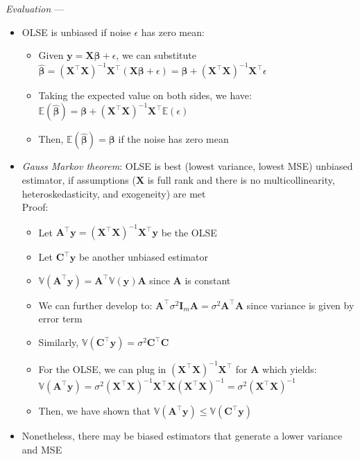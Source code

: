 \emph{Evaluation} ---
\begin{itemize}
    \item OLSE is unbiased if noise $\epsilon$ has zero mean:
    \begin{itemize}
        \item Given $\boldsymbol{y} = \boldsymbol{X}\boldsymbol{\beta} + \epsilon$, we can substitute $\boldsymbol{\hat{\beta}} = (\boldsymbol{X}^\intercal \boldsymbol{X})^{-1}  \boldsymbol{X}^\intercal (\boldsymbol{X}\boldsymbol{\beta} + \epsilon) = \boldsymbol{\beta} + (\boldsymbol{X}^\intercal \boldsymbol{X})^{-1}  \boldsymbol{X}^\intercal \epsilon$
        \item Taking the expected value on both sides, we have: $\mathbb{E}(\boldsymbol{\hat{\beta}}) = \boldsymbol{\beta} + (\boldsymbol{X}^\intercal \boldsymbol{X})^{-1}  \boldsymbol{X}^\intercal \mathbb{E}(\epsilon)$
        \item Then, $\mathbb{E}(\boldsymbol{\hat{\beta}}) = \boldsymbol{\beta}$ if the noise has zero mean
    \end{itemize}
    \item \emph{Gauss Markov theorem}: OLSE is best (lowest variance, lowest MSE) unbiased estimator, if assumptions ($\boldsymbol{X}$ is full rank and there is no multicollinearity, heteroskedasticity, and exogeneity) are met\\
    Proof:
    \begin{itemize}
        \item Let $\boldsymbol{A}^\intercal \boldsymbol{y} = (\boldsymbol{X}^\intercal \boldsymbol{X})^{-1}  \boldsymbol{X}^\intercal \boldsymbol{y}$ be the OLSE
        \item Let $\boldsymbol{C}^\intercal \boldsymbol{y}$ be another unbiased estimator
        \item $\mathbb{V}(\boldsymbol{A}^\intercal \boldsymbol{y}) = \boldsymbol{A}^\intercal \mathbb{V}(\boldsymbol{y}) \boldsymbol{A}$ since $\boldsymbol{A}$ is constant
        \item We can further develop to: $\boldsymbol{A}^\intercal \sigma^2 \boldsymbol{I}_m \boldsymbol{A} = \sigma^2 \boldsymbol{A}^\intercal \boldsymbol{A}$ since variance is given by error term
        \item Similarly, $\mathbb{V}(\boldsymbol{C}^\intercal \boldsymbol{y}) = \sigma^2 \boldsymbol{C}^\intercal \boldsymbol{C} $
        \item For the OLSE, we can plug in $(\boldsymbol{X}^\intercal \boldsymbol{X})^{-1}  \boldsymbol{X}^\intercal$ for $\boldsymbol{A}$ which yields: $\mathbb{V}(\boldsymbol{A}^\intercal \boldsymbol{y}) = \sigma^2 (\boldsymbol{X}^\intercal \boldsymbol{X})^{-1}  \boldsymbol{X}^\intercal \boldsymbol{X} (\boldsymbol{X}^\intercal \boldsymbol{X})^{-1} = \sigma^2 (\boldsymbol{X}^\intercal \boldsymbol{X})^{-1}$ 
        \item Then, we have shown that $\mathbb{V}(\boldsymbol{A}^\intercal \boldsymbol{y}) \leq \mathbb{V}(\boldsymbol{C}^\intercal \boldsymbol{y})$
    \end{itemize}
    \item Nonetheless, there may be biased estimators that generate a lower variance and MSE
\end{itemize}

